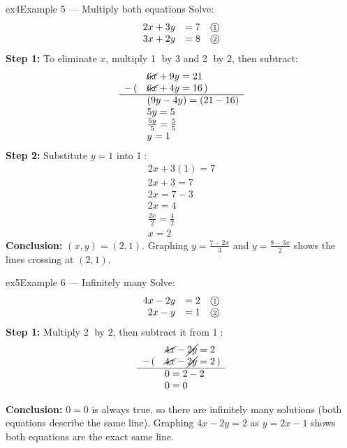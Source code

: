 \documentclass[11pt]{article}
\begin{document}
\begin{example}{ex4}{Example 5 --- Multiply both equations}
Solve:\[\begin{array}{rll} 2x+3y & = 7 & \text{\textcircled{\scriptsize 1}}\\ 3x+2y & = 8 & \text{\textcircled{\scriptsize 2}} \end{array}\]\soln
\textbf{Step 1:} To eliminate $x$, multiply \textcircled{\scriptsize 1} by $3$ and \textcircled{\scriptsize 2} by $2$, then subtract:\[\begin{array}{rl} & \cancel{6x}+9y=21\\ -\,( & \cancel{6x}+4y=16\,)\\ \hline & (9y-4y)=(21-16)\\ & 5y=5\\ & \frac{5y}{5}=\frac{5}{5}\\ & y=1 \end{array}\]
\textbf{Step 2:} Substitute $y=1$ into \textcircled{\scriptsize 1}:\[\begin{array}{l} 2x+3(1)=7\\ 2x+3=7\\ 2x=7-3\\ 2x=4\\ \frac{2x}{2}=\frac{4}{2}\\ x=2 \end{array}\]
\textbf{Conclusion:} $(x,y)=(2,1)$.
Graphing $y=\tfrac{7-2x}3$ and $y=\tfrac{8-3x}2$ shows the lines crossing at $(2,1)$.
\end{example}

\begin{example}{ex5}{Example 6 --- Infinitely many}
Solve:\[\begin{array}{rll} 4x-2y & = 2 & \text{\textcircled{\scriptsize 1}}\\ 2x-y & = 1 & \text{\textcircled{\scriptsize 2}} \end{array}\]\soln
\textbf{Step 1:} Multiply \textcircled{\scriptsize 2} by $2$, then subtract it from \textcircled{\scriptsize 1}:\[\begin{array}{rl} & \cancel{4x}-\cancel{2y}=2\\ -\,( & \cancel{4x}-\cancel{2y}=2\,)\\ \hline & 0=2-2\\ & 0=0 \end{array}\]

\textbf{Conclusion:} $0=0$ is always true, so there are infinitely many solutions (both equations describe the same line).
Graphing $4x-2y=2$ as $y=2x-1$ shows both equations are the exact same line.
\end{example}
\end{document}
